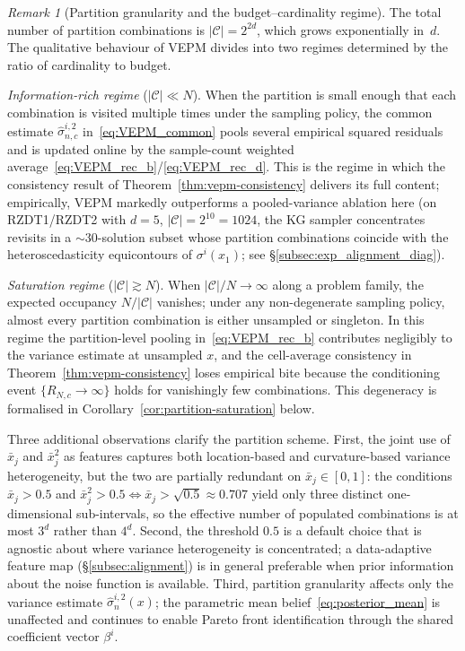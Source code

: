 \documentclass[12pt]{article}
\theoremstyle{plain}
\theoremstyle{definition}
\theoremstyle{remark}
\newtheorem{remark}{Remark}[section]
\begin{document}
\begin{remark}[Partition granularity and the budget--cardinality regime]
\label{rem:partition}
The total number of partition combinations is $|\mathcal{C}| = 2^{2d}$, which grows exponentially in~$d$.  The qualitative behaviour of VEPM divides into two regimes determined by the ratio of cardinality to budget.

\emph{Information-rich regime} ($|\mathcal{C}| \ll N$).  When the partition is small enough that each combination is visited multiple times under the sampling policy, the common estimate $\hat{\sigma}^{i,2}_{n,c}$ in~\eqref{eq:VEPM_common} pools several empirical squared residuals and is updated online by the sample-count weighted average~\eqref{eq:VEPM_rec_b}/\eqref{eq:VEPM_rec_d}.  This is the regime in which the consistency result of Theorem~\ref{thm:vepm-consistency} delivers its full content; empirically, VEPM markedly outperforms a pooled-variance ablation here (on RZDT1/RZDT2 with $d=5$, $|\mathcal{C}|=2^{10}=1024$, the KG sampler concentrates revisits in a $\sim$30-solution subset whose partition combinations coincide with the heteroscedasticity equicontours of $\sigma^{i}(x_1)$; see \S\ref{subsec:exp_alignment_diag}).

\emph{Saturation regime} ($|\mathcal{C}| \gtrsim N$).  When $|\mathcal{C}|/N \to \infty$ along a problem family, the expected occupancy $N/|\mathcal{C}|$ vanishes; under any non-degenerate sampling policy, almost every partition combination is either unsampled or singleton.  In this regime the partition-level pooling in~\eqref{eq:VEPM_rec_b} contributes negligibly to the variance estimate at unsampled $x$, and the cell-average consistency in Theorem~\ref{thm:vepm-consistency} loses empirical bite because the conditioning event $\{R_{N,c}\to\infty\}$ holds for vanishingly few combinations.  This degeneracy is formalised in Corollary~\ref{cor:partition-saturation} below.

Three additional observations clarify the partition scheme.  First, the joint use of $\bar{x}_j$ and $\bar{x}_j^{2}$ as features captures both location-based and curvature-based variance heterogeneity, but the two are partially redundant on $\bar{x}_j\in[0,1]$: the conditions $\bar{x}_j>0.5$ and $\bar{x}_j^{2}>0.5\Leftrightarrow\bar{x}_j>\sqrt{0.5}\approx0.707$ yield only three distinct one-dimensional sub-intervals, so the effective number of populated combinations is at most $3^{d}$ rather than $4^{d}$.  Second, the threshold $0.5$ is a default choice that is agnostic about where variance heterogeneity is concentrated; a data-adaptive feature map (\S\ref{subsec:alignment}) is in general preferable when prior information about the noise function is available.  Third, partition granularity affects only the variance estimate $\hat{\sigma}^{i,2}_n(x)$; the parametric mean belief~\eqref{eq:posterior_mean} is unaffected and continues to enable Pareto front identification through the shared coefficient vector $\beta^{i}$.


\end{remark}
\end{document}
